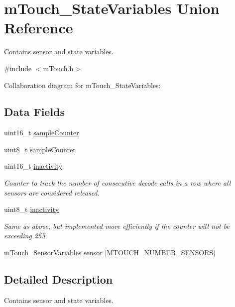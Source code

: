 \hypertarget{structm_touch___state_variables}{}\section{m\+Touch\+\_\+\+State\+Variables Union Reference}
\label{structm_touch___state_variables}


Contains sensor and state variables.  




{\ttfamily \#include $<$m\+Touch.\+h$>$}



Collaboration diagram for m\+Touch\+\_\+\+State\+Variables\+:
\subsection*{Data Fields}
\begin{DoxyCompactItemize}
\item 
uint16\+\_\+t \hyperlink{structm_touch___state_variables_a99c520ba011c1d8bcb6a72ffd51196c9}{sample\+Counter}
\item 
uint8\+\_\+t \hyperlink{structm_touch___state_variables_a5413f90a1ad32d11a00aa20df8d9ba3c}{sample\+Counter}
\item 
uint16\+\_\+t \hyperlink{structm_touch___state_variables_ac0aad0e526866eb2e45ffabeaa89453d}{inactivity}
\begin{DoxyCompactList}\small\item\em Counter to track the number of consecutive decode calls in a row where all sensors are considered released. \end{DoxyCompactList}\item 
uint8\+\_\+t \hyperlink{structm_touch___state_variables_a5b3fdb1d6accca0c21fbf4ae06912074}{inactivity}
\begin{DoxyCompactList}\small\item\em Same as above, but implemented more efficiently if the counter will not be exceeding 255. \end{DoxyCompactList}\item 
\hyperlink{structm_touch___sensor_variables}{m\+Touch\+\_\+\+Sensor\+Variables} \hyperlink{structm_touch___state_variables_a4205dd81984b86d07522a6bd719e2c99}{sensor} \mbox{[}M\+T\+O\+U\+C\+H\+\_\+\+N\+U\+M\+B\+E\+R\+\_\+\+S\+E\+N\+S\+O\+R\+S\mbox{]}
\end{DoxyCompactItemize}


\subsection{Detailed Description}
Contains sensor and state variables. 

